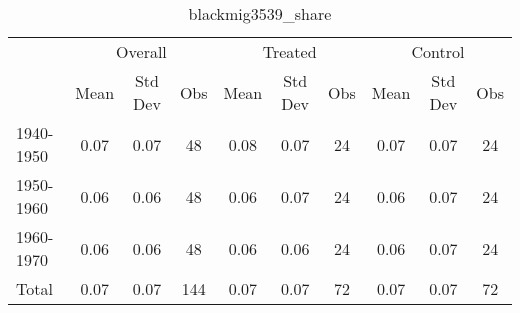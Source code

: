 \begin{table}[htbp]\centering
\def\sym#1{\ifmmode^{#1}\else\(^{#1}\)\fi}
\caption{blackmig3539\_share \label{tab1}}
\begin{tabular}{l*{3}{ccc}}
\toprule
                    &\multicolumn{3}{c}{Overall}           &\multicolumn{3}{c}{Treated}           &\multicolumn{3}{c}{Control}           \\
                    &        Mean&     Std Dev&         Obs&        Mean&     Std Dev&         Obs&        Mean&     Std Dev&         Obs\\
\midrule
1940-1950           &        0.07&        0.07&          48&        0.08&        0.07&          24&        0.07&        0.07&          24\\
1950-1960           &        0.06&        0.06&          48&        0.06&        0.07&          24&        0.06&        0.07&          24\\
1960-1970           &        0.06&        0.06&          48&        0.06&        0.06&          24&        0.06&        0.07&          24\\
Total               &        0.07&        0.07&         144&        0.07&        0.07&          72&        0.07&        0.07&          72\\
\bottomrule
\end{tabular}
\end{table}
